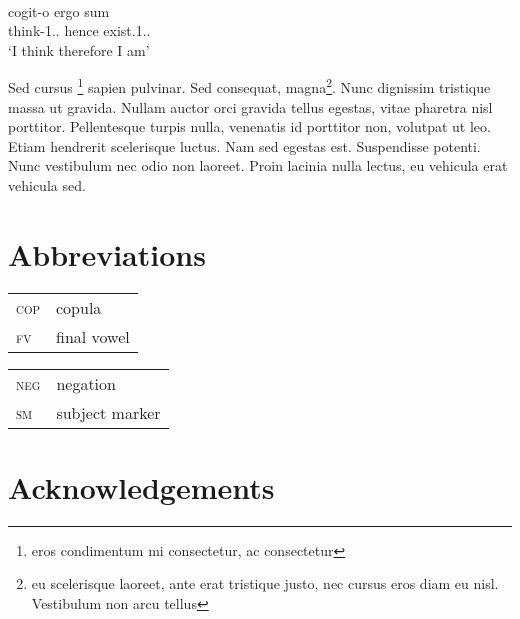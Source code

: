 \documentclass[output=paper
	        ,collection
	        ,collectionchapter
 	        ,biblatex
                ,babelshorthands
                ,newtxmath
                ,draftmode
                ,colorlinks, citecolor=brown
]{langscibook}
\begin{document}
\citet{Meier2017}
\ea\label{ex:1:descartes}
\\
\gll cogit-o ergo sum \\
think-1{\SG}.{\PRS}.{\IND} hence exist.1{\SG}.{\PRS}.{\IND}\\
\glt `I think therefore I am'
\z


Sed cursus \footnote{eros condimentum mi consectetur, ac consectetur} sapien pulvinar. Sed consequat, magna\footnote{eu scelerisque laoreet, ante erat tristique justo, nec cursus eros diam eu nisl. Vestibulum non arcu tellus}. Nunc dignissim tristique massa ut gravida. Nullam auctor orci gravida tellus egestas, vitae pharetra nisl porttitor. Pellentesque turpis nulla, venenatis id porttitor non, volutpat ut leo. Etiam hendrerit scelerisque luctus. Nam sed egestas est. Suspendisse potenti. Nunc vestibulum nec odio non laoreet. Proin lacinia nulla lectus, eu vehicula erat vehicula sed. 

\section*{Abbreviations}
\begin{tabularx}{.45\textwidth}{lX}
\textsc{cop} & copula\\ 
\textsc{fv} & final vowel\\
\end{tabularx}
\begin{tabularx}{.45\textwidth}{lX}
\textsc{neg} & negation\\ 
\textsc{sm} & subject marker\\
\end{tabularx}


\section*{Acknowledgements}

{\sloppy
\printbibliography[heading=subbibliography,notkeyword=this]
}
\end{document}
